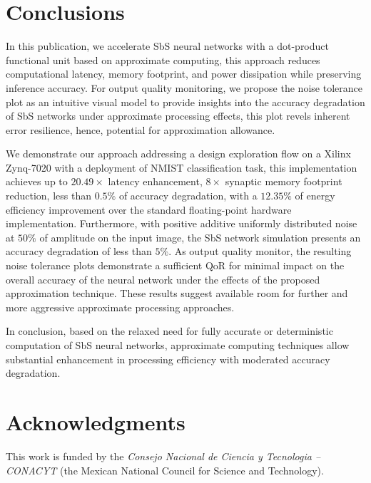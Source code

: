 \section{Conclusions}
\label{sec:conclusions}
In this publication, we accelerate SbS neural networks with a dot-product functional unit based on approximate computing, this approach reduces computational latency, memory footprint, and power dissipation while preserving inference accuracy. For output quality monitoring, we propose the noise tolerance plot as an intuitive visual model to provide insights into the accuracy degradation of SbS networks under approximate processing effects, this plot revels inherent error resilience, hence, potential for approximation allowance.

We demonstrate our approach addressing a design exploration flow on a Xilinx Zynq-7020 with a deployment of NMIST classification task, this implementation achieves up to $20.49\times$ latency enhancement, $8\times$ synaptic memory footprint reduction, less than $0.5\%$ of accuracy degradation, with a $12.35\%$ of energy efficiency improvement over the standard floating-point hardware implementation. Furthermore, with positive additive uniformly distributed noise at $50\%$ of amplitude on the input image, the SbS network simulation presents an accuracy degradation of less than $5\%$. As output quality monitor, the resulting noise tolerance plots demonstrate a sufficient QoR for minimal impact on the overall accuracy of the neural network under the effects of the proposed approximation technique. These results suggest available room for further and more aggressive approximate processing approaches.

In conclusion, based on the relaxed need for fully accurate or deterministic computation of SbS neural networks, approximate computing techniques allow substantial enhancement in processing efficiency with moderated accuracy degradation.

\section * {Acknowledgments}\label{sec:Ack}
This work is funded by the \textit{Consejo Nacional de Ciencia y Tecnologia -- CONACYT} (the Mexican National Council for Science and Technology).

